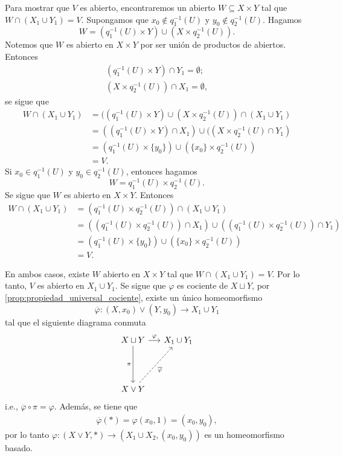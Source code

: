\begin{dem}
    Para mostrar que $V$ es abierto, encontraremos un abierto $W\subseteq X\times Y$ tal que $W\cap (X_1\cup Y_1) = V$. Supongamos que $x_0\notin q_1^{-1}(U)$ y $y_0\notin q_2^{-1}(U)$. 
    Hagamos
    \[
    W = (q_1^{-1}(U)\times Y) \cup (X\times q_2^{-1}(U)).
    \]
    Notemos que $W$ es abierto en $X\times Y$ por ser unión de productos de abiertos. Entonces
    \begin{align*}
        (q_1^{-1}(U)\times Y)\cap Y_1=\emptyset;\\
        (X\times q_2^{-1}(U))\cap X_1=\emptyset,
    \end{align*}
    se sigue que
    \begin{align*}
        W\cap (X_1\cup Y_1) &= ((q_1^{-1}(U)\times Y) \cup (X\times q_2^{-1}(U)) \cap ( X_1\cup Y_1) \\
        &= ((q_1^{-1}(U)\times Y)\cap X_1) \cup ((X\times q_2^{-1}(U)\cap Y_1)\\
        &= (q_1^{-1}(U)\times \{y_0\}) \cup (\{x_0\}\times q_2^{-1}(U)) \\
        &= V.
    \end{align*}
    Si $x_0\in q_1^{-1}(U)$ y $y_0\in q_2^{-1}(U)$, entonces hagamos
    \[
    W = q_1^{-1}(U)\times q_2^{-1}(U).
    \]
    Se sigue que $W$ es abierto en $X\times Y$. Entonces
    \begin{align*}
        W\cap (X_1\cup Y_1) &= (q_1^{-1}(U)\times q_2^{-1}(U)) \cap ( X_1\cup Y_1) \\
        &= ((q_1^{-1}(U)\times q_2^{-1}(U))\cap X_1)\cup
         ((q_1^{-1}(U)\times q_2^{-1}(U))\cap Y_1)\\
         &= (q_1^{-1}(U)\times \{y_0\}) \cup (\{x_0\}\times q_2^{-1}(U))\\
         &=V.
    \end{align*}

    En ambos casos, existe $W$ abierto en $X\times Y$ tal que $W\cap (X_1\cup Y_1) = V$. Por lo tanto, $V$ es abierto en $X_1\cup Y_1$. Se sigue que $\varphi$ es cociente de $X\sqcup Y$, por \ref{prop:propiedad_universal_cociente}, existe un único homeomorfismo 
    \[
    \overline{\varphi}:(X,x_0)\vee (Y,y_0)\to X_1\cup Y_1
    \]
    tal que el siguiente diagrama conmuta
    \[
    \begin{tikzcd}[column sep=0.5cm, row sep=1.5cm] 
        X\sqcup Y\arrow[r,"\varphi"] \arrow[d,"\pi"'] & 
        X_1\cup Y_1\\
        X\vee Y \arrow[ur, dashed, "\overline{\varphi}"']
    \end{tikzcd}
    \]
    i.e., $\overline{\varphi}\circ\pi=\varphi$. Además,
    se tiene que
    \begin{align*}
        \overline{\varphi}(*)=\varphi(x_0,1)=(x_0,y_0),
    \end{align*}
    por lo tanto $\varphi:(X\vee Y,*)\to (X_1\cup X_2,(x_0,y_0))$ es un homeomorfismo basado.


\end{dem}
